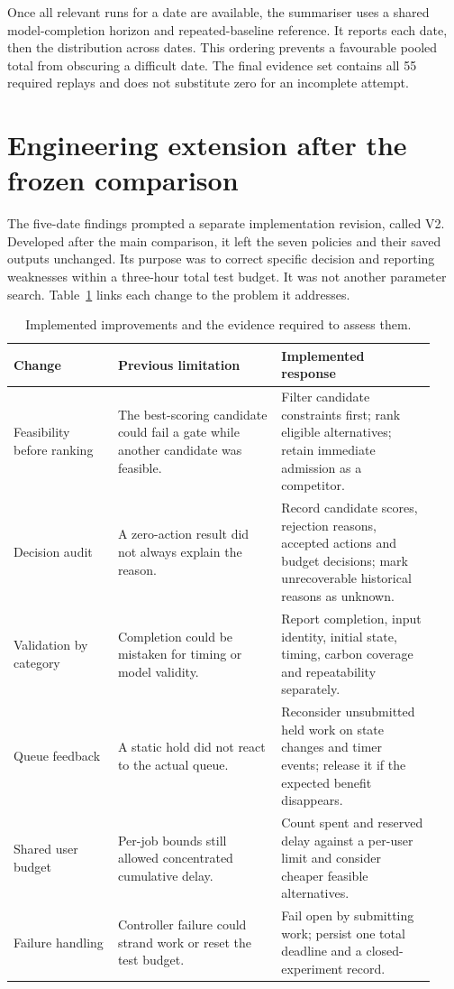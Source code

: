 Once all relevant runs for a date are available, the summariser uses a shared model-completion horizon and repeated-baseline reference. It reports each date, then the distribution across dates. This ordering prevents a favourable pooled total from obscuring a difficult date. The final evidence set contains all 55 required replays and does not substitute zero for an incomplete attempt.

\section{Engineering extension after the frozen comparison}\label{sec:v2-design}
The five-date findings prompted a separate implementation revision, called V2. Developed after the main comparison, it left the seven policies and their saved outputs unchanged. Its purpose was to correct specific decision and reporting weaknesses within a three-hour total test budget. It was not another parameter search. Table~\ref{tab:engineering-changes} links each change to the problem it addresses.

\begin{table}[htbp]\centering\small
\caption{Implemented improvements and the evidence required to assess them.}\label{tab:engineering-changes}
\begin{tabular}{@{}>{\raggedright\arraybackslash}p{0.23\linewidth}>{\raggedright\arraybackslash}p{0.36\linewidth}>{\raggedright\arraybackslash}p{0.34\linewidth}@{}}\toprule
Change & Previous limitation & Implemented response\\\midrule
Feasibility before ranking & The best-scoring candidate could fail a gate while another candidate was feasible. & Filter candidate constraints first; rank eligible alternatives; retain immediate admission as a competitor.\\
Decision audit & A zero-action result did not always explain the reason. & Record candidate scores, rejection reasons, accepted actions and budget decisions; mark unrecoverable historical reasons as unknown.\\
Validation by category & Completion could be mistaken for timing or model validity. & Report completion, input identity, initial state, timing, carbon coverage and repeatability separately.\\
Queue feedback & A static hold did not react to the actual queue. & Reconsider unsubmitted held work on state changes and timer events; release it if the expected benefit disappears.\\
Shared user budget & Per-job bounds still allowed concentrated cumulative delay. & Count spent and reserved delay against a per-user limit and consider cheaper feasible alternatives.\\
Failure handling & Controller failure could strand work or reset the test budget. & Fail open by submitting work; persist one total deadline and a closed-experiment record.\\\bottomrule
\end{tabular}
\end{table}

